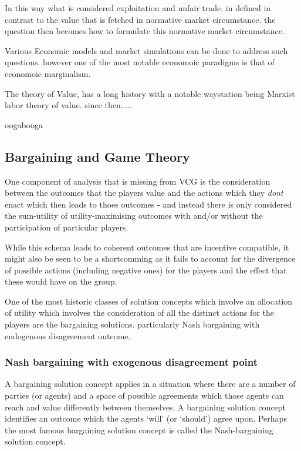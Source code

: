  




In this way what is considered exploitation and unfair trade, in defined in contrast to the value that is fetched in normative market circumstance.
the question then becomes how to formulate this normative market circumstance.

Various Economic models and market simulations can be done to address such questions.
however one of the most notable economoic paradigms is that of economoic marginalism.

The theory of Value, has a long history with a notable waystation being Marxist labor theory of value. since then.....

oogabooga


\subsection{Bargaining and Game Theory}\label{sec:solutions_bargaining}

One component of analysis that is missing from VCG is the consideration between the outcomes that the players value and the actions which they \textit{dont} enact which then leads to thoes outcomes - and instead there is only considered the sum-utility of utility-maximising outcomes with and/or without the participation of particular players.

While this schema leads to coherent outcomes that are incentive compatible, it might also be seen to be a shortcomming as it fails to account for the divergence of possible actions (including negative ones) for the players and the effect that these would have on the group.

One of the most historic classes of solution concepts which involve an allocation of utility which involves the consideration of all the distinct actions for the players are the bargaining solutions.
particularly Nash bargaining with endogenous disagreement outcome.

\subsubsection{Nash bargaining with exogenous disagreement point}\label{sec:nash_bargaining_exogenous}

A bargaining solution concept applies in a situation where there are a number of parties (or agents) and a space of possible agreements which those agents can reach and value differently between themselves.
A bargaining solution concept identifies an outcome which the agents `will' (or `should') agree upon.
Perhaps the most famous bargaining solution concept is called the Nash-bargaining solution concept.

